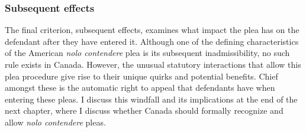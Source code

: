 \subsubsection{Subsequent effects}

The final criterion, subsequent effects, examines what impact the plea has on the defendant after they have entered it. Although one of the defining characteristics of the American \textit{nolo contendere} plea is its subsequent inadmissibility, no such rule exists in Canada. However, the unusual statutory interactions that allow this plea procedure give rise to their unique quirks and potential benefits. Chief amongst these is the automatic right to appeal that defendants have when entering these pleas. I discuss this windfall and its implications at the end of the next chapter, where I discuss whether Canada should formally recognize and allow \textit{nolo contendere} pleas.